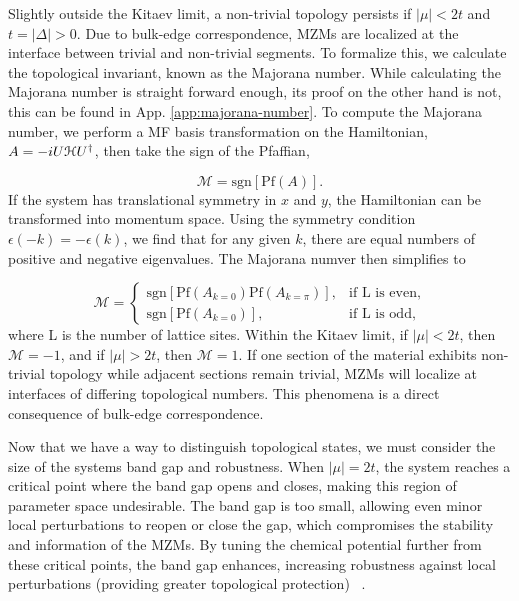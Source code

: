 Slightly outside the Kitaev limit, a non-trivial topology persists if $|\mu| < 2t$ and $t = |\Delta| >0$.
Due to bulk-edge correspondence, MZMs are localized at the interface between trivial and non-trivial segments.
To formalize this, we calculate the topological invariant, known as the Majorana number.
While calculating the Majorana number is straight forward enough, its proof on the other hand is not, this can be found in App. \ref{app:majorana-number}.
To compute the Majorana number, we perform a MF basis transformation on the Hamiltonian, $A = -iU \mathcal{H} U^{\dagger}$, then take the sign of the Pfaffian,

\begin{equation}
  \mathcal{M} = \text{sgn} [\text{Pf} (A)].
\end{equation}
If the system has translational symmetry in $x$ and $y$, the Hamiltonian can be transformed into momentum space.
Using the symmetry condition $\epsilon(-k) = -\epsilon(k)$, we find that for any given $k$, there are equal numbers of positive and negative eigenvalues.
The Majorana numver then simplifies to

\begin{equation}
  \mathcal{M} =
  \begin{cases}
    \text{sgn} [\text{Pf} (A_{k=0}) \text{Pf} (A_{k=\pi})], &\text{if L is even}, \\
    \text{sgn} [\text{Pf} (A_{k=0})], &\text{if L is odd},
  \end{cases}
\end{equation}
where L is the number of lattice sites.
Within the Kitaev limit, if $|\mu|< 2t$, then $\mathcal{M} = -1$, and if $|\mu| > 2t$, then $\mathcal{M} = 1$.
If one section of the material exhibits non-trivial topology while adjacent sections remain trivial, MZMs will localize at interfaces of differing topological numbers.
This phenomena is a direct consequence of bulk-edge correspondence.

Now that we have a way to distinguish topological states, we must consider the size of the systems band gap and robustness.
When $|\mu| = 2t$, the system reaches a critical point where the band gap opens and closes, making this region of parameter space undesirable.
The band gap is too small, allowing even minor local perturbations to reopen or close the gap, which compromises the stability and information of the MZMs.
By tuning the chemical potential further from these critical points, the band gap enhances, increasing robustness against local perturbations (providing greater topological protection) ~\cite{kitaevUnpairedMajoranaFermions2001}.

